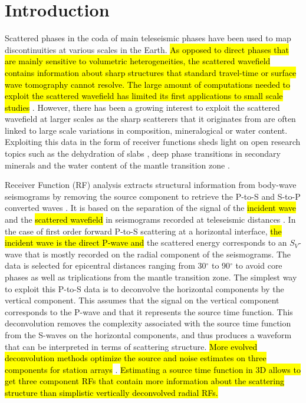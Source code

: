 \documentclass[10pt,a4paper]{article}
\begin{document}
\vspace{10mm}

\section{Introduction}

Scattered phases in the coda of main teleseismic phases have been used to map discontinuities at various scales in the Earth. 
\hl{As opposed to direct phases that are mainly sensitive to volumetric heterogeneities, the scattered wavefield contains information about sharp structures that standard travel-time or surface wave tomography cannot resolve.
The large amount of computations needed to exploit the scattered wavefield has limited its first applications to small scale studies} \citep{lang_jgr_79}.
However, there has been a growing interest to exploit the scattered wavefield at larger scales as the sharp scatterers that it originates from are often linked to large scale variations in composition, mineralogical or water content. 
Exploiting this data in the form of receiver functions sheds light on open research topics such as the dehydration of slabs \citep{tauz_epsl_17}, deep phase transitions in secondary minerals \citep{cott_jgr_16} and the water content of the mantle transition zone \citep{zhen_sci_07}.

Receiver Function (RF) analysis extracts structural information from body-wave seismograms by removing the source component to retrieve the P-to-S and S-to-P converted waves \citep{lang_jgr_79,bost_gji_99,park_bssa_00}. 
It is based on the separation of the signal of the \hl{incident wave} and the \hl{scattered wavefield} in seismograms recorded at teleseismic distances \citep{phin_jgr_64,lang_jgr_79}. 
In the case of first order forward P-to-S scattering at a horizontal interface, \hl{the incident wave is the direct P-wave and} the scattered energy corresponds to an $S_V$-wave that is mostly recorded on the radial component of the seismograms. 
The data is selected for epicentral distances ranging from 30$^{\circ}$ to 90$^{\circ}$ to avoid core phases as well as triplications from the mantle transition zone. 
The simplest way to exploit this P-to-S data is to deconvolve the horizontal components by the vertical component. 
This assumes that the signal on the vertical component corresponds to the P-wave and that it represents the source time function.
This deconvolution removes the complexity associated with the source time function from the S-waves on the horizontal components, and thus produces a waveform that can be interpreted in terms of scattering structure. 
\hl{More evolved deconvolution methods optimize the source and noise estimates on three components for station arrays} \citep{chen_gji_10}.
\hl{Estimating a source time function in 3D allows to get three component RFs that contain more information about the scattering structure than simplistic vertically deconvolved radial RFs.}
\end{document}
